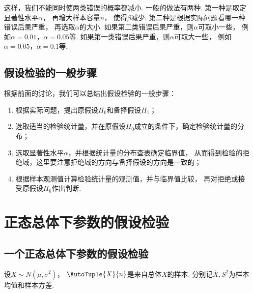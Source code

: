 这样，我们不能同时使两类错误的概率都减小.
一般的做法有两种.
第一种是取定显著性水平\(\alpha\)，
再增大样本容量\(n\)，
使得\(\beta\)减少.
第二种是根据实际问题看哪一种错误后果严重，
再选取\(\alpha\)的大小.
如果第二类错误后果严重，则\(\alpha\)可取小一些，
例如\(\alpha=0.01\)，\(\alpha=0.05\)等.
如果第一类错误后果严重，则\(\alpha\)可取大一些，
例如\(\alpha=0.05\)，\(\alpha=0.1\)等.

\subsection{假设检验的一般步骤}
根据前面的讨论，我们可以总结出假设检验的一般步骤：\begin{enumerate}
	\item 根据实际问题，提出原假设\(H_0\)和备择假设\(H_1\)；
	\item 选取适当的检验统计量，并在原假设\(H_0\)成立的条件下，确定检验统计量的分布；
	\item 选取显著性水平\(\alpha\)，并根据统计量的分布查表确定临界值，
	从而得到检验的拒绝域，这里要注意拒绝域的方向与备择假设的方向是一致的；
	\item 根据样本观测值计算检验统计量的观测值，并与临界值比较，
	再对拒绝或接受原假设\(H_0\)作出判断.
\end{enumerate}

\section{正态总体下参数的假设检验}
\subsection{一个正态总体下参数的假设检验}
设\(X \sim N(\mu,\sigma^2)\)，
\(\AutoTuple{X}{n}\)是来自总体\(X\)的样本.
分别记\(\overline{X},S^2\)为样本均值和样本方差.

